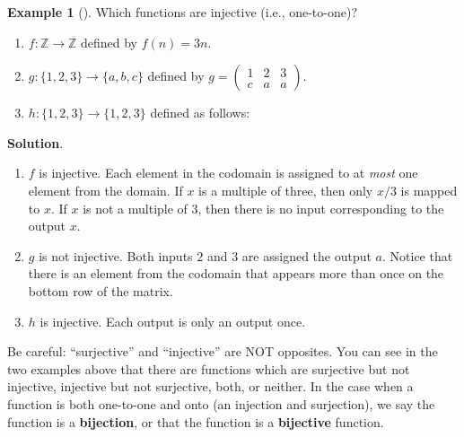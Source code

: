 \documentclass[10pt,]{book}
\newcommand{\terminology}[1]{\textbf{#1}}
\theoremstyle{plain}
\theoremstyle{definition}
\theoremstyle{definition}
\newtheorem{example}[theorem]{Example}
\theoremstyle{definition}
\theoremstyle{definition}
\numberwithin{equation}{chapter}
\def\Z{\mathbb Z}
\newcommand{\amp}{&}
\begin{document}
\begin{example}[]\label{example-51}
\hypertarget{p-1747}{}%
Which functions are injective (i.e., one-to-one)?%
\par
\hypertarget{p-1748}{}%
\leavevmode%
\begin{enumerate}
\item\hypertarget{li-543}{}\(f:\Z \to \Z\) defined by \(f(n) = 3n\).%
\item\hypertarget{li-544}{}\(g: \{1,2,3\} \to \{a,b,c\}\) defined by \(g = \begin{pmatrix}1 \amp 2 \amp 3 \\ c \amp a \amp a \end{pmatrix}\).%
\item\hypertarget{li-545}{}\hypertarget{p-1749}{}%
\(h:\{1,2,3\} \to \{1,2,3\}\) defined as follows:%
\begin{sidebyside}{1}{0.4}{0.4}{0}
\begin{sbspanel}{0.2}
\end{sbspanel}
\end{sidebyside}
\end{enumerate}
%
\par\smallskip%
\noindent\textbf{Solution}.\hypertarget{solution-146}{}\quad%
\hypertarget{p-1750}{}%
\leavevmode%
\begin{enumerate}
\item\hypertarget{li-546}{}\(f\) is injective. Each element in the codomain is assigned to at \emph{most} one element from the domain. If \(x\) is a multiple of three, then only \(x/3\) is mapped to \(x\). If \(x\) is not a multiple of 3, then there is no input corresponding to the output \(x\).%
\item\hypertarget{li-547}{}\(g\) is not injective. Both inputs \(2\) and \(3\) are assigned the output \(a\). Notice that there is an element from the codomain that appears more than once on the bottom row of the matrix.%
\item\hypertarget{li-548}{}\(h\) is injective. Each output is only an output once.%
\end{enumerate}
%
\end{example}
\hypertarget{p-1751}{}%
Be careful: ``surjective'' and ``injective'' are NOT opposites.  You can see in the two examples above that there are functions which are surjective but not injective, injective but not surjective, both, or neither. In the case when a function is both one-to-one and onto (an injection and surjection), we say the function is a \terminology{bijection}, or that the function is a \terminology{bijective} function.%
\end{document}
